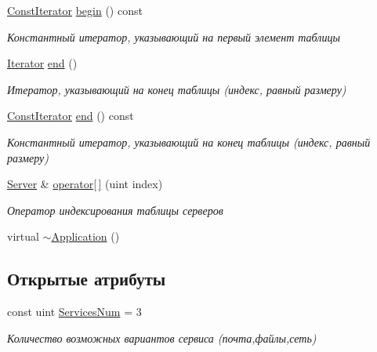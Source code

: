 \begin{DoxyCompactItemize}
\hyperlink{class_network_service_1_1_application_a51fff3b7cce6bf84c2edbd887c0cac45}{Const\+Iterator} \hyperlink{class_network_service_1_1_application_a2d3762c2bc3f66e96b1295ec584f779d}{begin} () const 
\begin{DoxyCompactList}\small\item\em Константный итератор, указывающий на первый элемент таблицы \end{DoxyCompactList}\item 
\hyperlink{class_network_service_1_1_application_a206937019d86d3391a209e9883b44f7b}{Iterator} \hyperlink{class_network_service_1_1_application_ab0fcfd1baa6f19b018ad6e8ab7ca122c}{end} ()
\begin{DoxyCompactList}\small\item\em Итератор, указывающий на конец таблицы (индекс, равный размеру) \end{DoxyCompactList}\item 
\hyperlink{class_network_service_1_1_application_a51fff3b7cce6bf84c2edbd887c0cac45}{Const\+Iterator} \hyperlink{class_network_service_1_1_application_ae464b274be530d8d8a546488780a077e}{end} () const 
\begin{DoxyCompactList}\small\item\em Константный итератор, указывающий на конец таблицы (индекс, равный размеру) \end{DoxyCompactList}\item 
\hyperlink{class_network_service_1_1_server}{Server} \& \hyperlink{class_network_service_1_1_application_a6dba76630cbd2d6863d2331475a18518}{operator\mbox{[}$\,$\mbox{]}} (uint index)
\begin{DoxyCompactList}\small\item\em Оператор индексирования таблицы серверов \end{DoxyCompactList}\item 
virtual \hyperlink{class_network_service_1_1_application_a748bca84fefb9c12661cfaa2f623748d}{$\sim$\+Application} ()
\end{DoxyCompactItemize}
\subsection*{Открытые атрибуты}
\begin{DoxyCompactItemize}
\item 
const uint \hyperlink{class_network_service_1_1_application_a95664d256ae9f339502b82b462d46365}{Services\+Num} = 3
\begin{DoxyCompactList}\small\item\em Количество возможных вариантов сервиса (почта,файлы,сеть) \end{DoxyCompactList}\end{DoxyCompactItemize}
